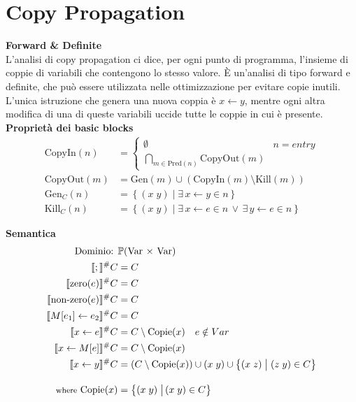 \documentclass[a4paper,12pt,openany]{article}
\begin{document}
    \clearpage\section*{Copy Propagation}
    \textbf{Forward \& Definite}\\[1em]
    L'analisi di copy propagation ci dice, per ogni punto di programma, l'insieme di coppie di variabili che contengono lo stesso valore. È un'analisi di tipo forward e definite, che può essere utilizzata nelle ottimizzazione per evitare copie inutili. L'unica istruzione che genera una nuova coppia è $x\leftarrow y$, mentre ogni altra modifica di una di queste variabili uccide tutte le coppie in cui è presente.\\[1em]
    \noindent\textbf{Proprietà dei basic blocks}
    \begin{align*}
        \mbox{CopyIn}(n) &=
        \begin{cases}
        \emptyset & n = entry\\
        \bigcap\limits_{m\in \mbox{Pred}(n)} \mbox{CopyOut}(m)
        \end{cases}\\
        \mbox{CopyOut}(m) &= \mbox{Gen}(m) \cup (\mbox{CopyIn}(m) \setminus \mbox{Kill}(m))\\
        \mbox{Gen}_{C}(n) &= \left\{
        (x\; y) \;\big\vert\; \exists\, x\leftarrow y \in n
        \right\}\\
        \mbox{Kill}_{C}(n) &= \left\{
        (x\; y) \;\big\vert\; \exists\, x\leftarrow e \in n \,\lor\, \exists\, y\leftarrow e \in n
        \right\}
    \end{align*}
    
    \textbf{Semantica}
    \begin{align*}
        \mbox{Dominio: }& \mathbb{P}(\mbox{Var $\times$ Var})\\
        \llbracket ; \rrbracket^\#C &= C\\
        \llbracket \mbox{zero}(e) \rrbracket^\#C &= C\\
        \llbracket \mbox{non-zero}(e) \rrbracket^\#C &= C\\
        \llbracket M[e_1]\leftarrow e_2 \rrbracket^\#C &= C\\
        \llbracket x \leftarrow e \rrbracket^\#C &= C\setminus \mbox{Copie}(x)\quad e\notin Var\\
        \llbracket x \leftarrow M[e] \rrbracket^\#C &= C\setminus \mbox{Copie}(x)\\
        \llbracket x\leftarrow y \rrbracket^\#C &= (C\setminus \mbox{Copie}(x)) \cup (x\;y) \cup
        \left\{
            (x\; z) \;\big\vert\; (z\; y) \in C
        \right\}\\[1em]
        \mbox{{\footnotesize where} Copie}(x) &=
        \left\{
        (x\; y) \;\big\vert\, (x\; y) \in C
        \right\}\\
    \end{align*}
    
\end{document}
